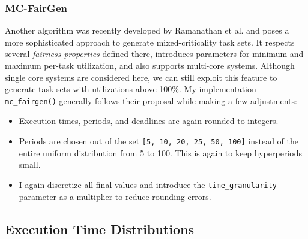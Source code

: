 \documentclass[a4paper,oneside]{csthesis}
\begin{document}
\subsubsection{MC-FairGen}
Another algorithm was recently developed by Ramanathan et al. \cite{ramanathan2016evaluation} and poses a more sophisticated approach to generate mixed-criticality task sets. It respects several \textit{fairness properties} defined there, introduces parameters for minimum and maximum per-task utilization, and also supports multi-core systems. Although single core systems are considered here, we can still exploit this feature to generate task sets with utilizations above 100\%. My implementation \texttt{mc\_fairgen()} generally follows their proposal while making a few adjustments:
\begin{itemize}
    \item Execution times, periods, and deadlines are again rounded to integers.
    \item Periods are chosen out of the set \texttt{[5, 10, 20, 25, 50, 100]} instead of the entire uniform distribution from 5 to 100. This is again to keep hyperperiods small.
    \item I again discretize all final values and introduce the \texttt{time\_granularity} parameter as a multiplier to reduce rounding errors.
\end{itemize}

\subsection{Execution Time Distributions}
\label{subsec:synt-dist}
\end{document}

